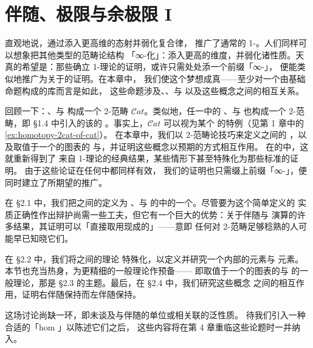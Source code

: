 \chapter{伴随、极限与余极限 I}\label{ch:adjunctions-limits-colimits-I}

直观地说，\trInfinityCategory{}通过添入更高维的态射并弱化复合律，
推广了通常的 1-\trCategory。人们同样可以想象把其他类型的范畴论结构
「∞-化」：添入更高的维度，并弱化诸性质。天真的希望是：那些确立
1-\trCategory{}理论的证明，或许只需处处添一个前缀「∞-」，
便能类似地推广为关于\trInfinityCategory{}的证明。在本章中，
我们使这个梦想成真——至少对一个由基础命题构成的库而言是如此，
这些命题涉及\trEquivalence{}、\trAdjunction{}、\trLimit{}与\trColimit{}%
以及这些概念之间的相互关系。

回顾一下：\trCategory{}、\trFunctor{}与\trNaturalTransformation{}%
构成一个 2-范畴 $\mathcal{C}at$。类似地，任一\trInfinityCosmos{}中的%
\trInfinityCategory{}、\trInfinityFunctor{}与\trInfinityNaturalTransformation{}%
也构成一个 2-范畴，即 §1.4 中引入的该\trInfinityCosmos{}的%
\trHomotopyTwoCategory。事实上，$\mathcal{C}at$ 可以视为某个%
\trHomotopyTwoCategory{}的特例（见第 1 章中的\cref{ex:homotopy-2cat-of-cat}）。
在本章中，我们以 2-范畴论技巧来定义\trInfinityCategory{}之间的%
\trAdjunction{}，以及取值于一个\trInfinityCategory{}的图表的%
\trLimit{}与\trColimit{}，并证明这些概念以预期的方式相互作用。
在\trInfinityCategory{}的\trHomotopyTwoCategory{}中，这就重新得到了
来自 1-\trCategory{}理论的经典结果，某些情形下甚至特殊化为那些标准的证明。
由于这些论证在任何\trHomotopyTwoCategory{}中都同样有效，
我们的证明也只需缀上前缀「∞-」，便同时建立了所期望的推广。

在 §2.1 中，我们把\trInfinityCategory{}之间的\trAdjunction{}定义为%
\trInfinityCategory{}、\trInfinityFunctor{}与\trInfinityNaturalTransformation{}%
的\trHomotopyTwoCategory{}中的一个\trAdjunction。尽管要为这个简单定义的
实质正确性作出辩护尚需一些工夫，但它有一个巨大的优势：关于伴随与%
\trEquivalence{}演算的许多结果，其证明可以「直接取用现成的」——意即
任何对 2-范畴足够稔熟的人可能早已知晓它们。

在 §2.2 中，我们将\trInfinityCategory{}之间的\trAdjunction{}理论
特殊化，以定义并研究一个\trInfinityCategory{}内部的\trInitial{}元素与%
\trTerminal{}元素。本节也充当热身，为更精细的一般理论作预备——
即取值于一个\trInfinityCategory{}的图表的\trLimit{}与\trColimit{}%
的一般理论，那是 §2.3 的主题。最后，在 §2.4 中，我们研究这些概念
之间的相互作用，证明右伴随保持\trLimit{}而左伴随保持\trColimit。

这场讨论尚缺一环，即未谈及与伴随的单位或\trLimit\trCone{}相关联的泛性质。
待我们引入一种合适的「hom \trInfinityCategory{}」以陈述它们之后，
这些内容将在第 4 章重临这些论题时一并纳入。

